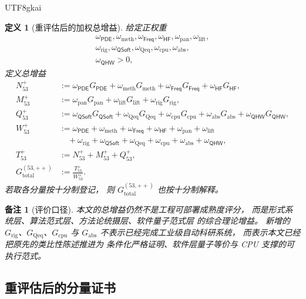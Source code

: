 \documentclass[12pt]{article}
\newtheorem{definition}{定义}[section]
\newtheorem{remark}{备注}[section]
\newcommand{\PDE}{\mathsf{PDE}}
\newcommand{\Freq}{\mathsf{Freq}}
\newcommand{\HF}{\mathsf{HF}}
\newcommand{\QSoft}{\mathsf{QSoft}}
\newcommand{\QHW}{\mathsf{QHW}}
\begin{document}
\begin{CJK*}{UTF8}{gkai}
\begin{definition}[重评估后的加权总增益]
给定正权重
\[
\begin{gathered}
  \omega_{\PDE},\omega_{\mathrm{meth}},\omega_{\Freq},
  \omega_{\HF},\omega_{\mathrm{pan}},\omega_{\mathrm{lift}},\\
  \omega_{\mathrm{rig}},\omega_{\QSoft},\omega_{\mathrm{Qeq}},
  \omega_{\mathrm{cpu}},\omega_{\mathrm{abs}},\\
  \omega_{\QHW}>0,
\end{gathered}
\]
定义总增益
\[
\begin{aligned}
  N_{53}^{+}
  &:=
    \omega_{\PDE}G_{\PDE}
    +\omega_{\mathrm{meth}}G_{\mathrm{meth}}
    +\omega_{\Freq}G_{\Freq}
    +\omega_{\HF}G_{\HF},\\
  M_{53}^{+}
  &:=
    \omega_{\mathrm{pan}}G_{\mathrm{pan}}
    +\omega_{\mathrm{lift}}G_{\mathrm{lift}}
    +\omega_{\mathrm{rig}}G_{\mathrm{rig}},\\
  Q_{53}^{+}
  &:=
    \omega_{\QSoft}G_{\QSoft}
    +\omega_{\mathrm{Qeq}}G_{\mathrm{Qeq}}
    +\omega_{\mathrm{cpu}}G_{\mathrm{cpu}}
    +\omega_{\mathrm{abs}}G_{\mathrm{abs}}
    +\omega_{\QHW}G_{\QHW},\\
  W_{53}^{+}
  &:=
    \omega_{\PDE}
    +\omega_{\mathrm{meth}}
    +\omega_{\Freq}
    +\omega_{\HF}
    +\omega_{\mathrm{pan}}
    +\omega_{\mathrm{lift}}\\
  &\quad
    +\omega_{\mathrm{rig}}
    +\omega_{\QSoft}
    +\omega_{\mathrm{Qeq}}
    +\omega_{\mathrm{cpu}}
    +\omega_{\mathrm{abs}}
    +\omega_{\QHW},\\
  T_{53}^{+}
  &:=
    N_{53}^{+}
    +M_{53}^{+}
    +Q_{53}^{+},\\
  G_{\mathrm{total}}^{(53,++)}
  &:=
    \frac{T_{53}^{+}}{W_{53}^{+}}.
\end{aligned}
\]
若取各分量按十分制登记，
则 \(G_{\mathrm{total}}^{(53,++)}\) 也按十分制解释。
\end{definition}

\begin{remark}[评价口径]
本文的总增益仍然不是工程可部署成熟度评分，
而是形式系统层、算法范式层、方法论统摄层、软件量子范式层
的综合理论增益。
新增的 \(G_{\mathrm{rig}}\)、\(G_{\mathrm{Qeq}}\)、\(G_{\mathrm{cpu}}\)
与 \(G_{\mathrm{abs}}\)
不表示已经完成工业级自动科研系统，
而表示本文已经把原先的类比性陈述推进为
条件化严格证明、软件层量子等价与 CPU 支撑的可执行范式。
\end{remark}

\subsection{重评估后的分量证书}
\label{subsec:tex53-gain-certs}


\end{CJK*}
\end{document}
